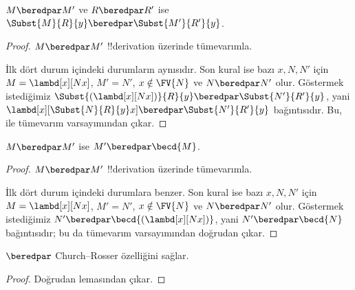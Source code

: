 \documentclass[../../../include/open-logic-section]{subfiles}
\begin{document}
\begin{lem}
  $M \beredpar M'$ ve $R \beredpar R'$ ise $\Subst{M}{R}{y}
  \beredpar \Subst{M'}{R'}{y}$.
\end{lem}

\begin{proof}
  $M \beredpar M'$ !!{derivation} üzerinde tümevarımla.

  İlk dört durum  içindeki durumların aynısıdır. Son kural
   ise bazı $x,N,N'$ için
  $M=\lambd[x][Nx]$, $M'=N'$, $x\notin\FV{N}$ ve $N\beredpar N'$ olur.
  Göstermek istediğimiz
  $\Subst{(\lambd[x][Nx])}{R}{y}\beredpar\Subst{N'}{R'}{y}$, yani
  $\lambd[x][\Subst{N}{R}{y}x]\beredpar\Subst{N'}{R'}{y}$ bağıntısıdır.
  Bu,  ile tümevarım
  varsayımından çıkar.
\end{proof}

\begin{lem}
  $M \beredpar M'$ ise $M' \beredpar \becd{M}$.
\end{lem}

\begin{proof}
  $M \beredpar M'$ !!{derivation} üzerinde tümevarımla.

  İlk dört durum  içindeki durumlara benzer. Son kural
   ise bazı $x,N,N'$ için
  $M=\lambd[x][Nx]$, $M'=N'$, $x\notin\FV{N}$ ve $N\beredpar N'$ olur.
  Göstermek istediğimiz $N'\beredpar\becd{(\lambd[x][Nx])}$, yani
  $N'\beredpar\becd{N}$ bağıntısıdır; bu da tümevarım varsayımından doğrudan
  çıkar.
\end{proof}

\begin{thm}
  $\beredpar$ Church--Rosser özelliğini sağlar.
\end{thm}

\begin{proof}
  Doğrudan  lemasından çıkar.
\end{proof}
\end{document}
